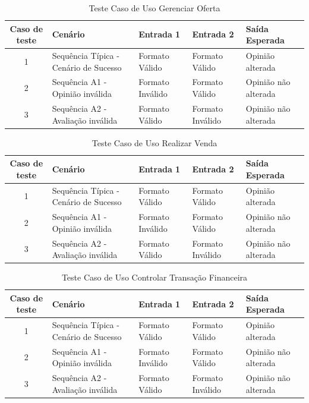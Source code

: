 \documentclass[a4paper,11pt]{article}
\begin{document}
	\begin{center}
	\begin{table}[H]
		\begin{tabularx}{\textwidth}{c|X|X|X|X}
			\textbf{Caso de teste} & \textbf{Cenário} & \textbf{Entrada 1} & \textbf{Entrada 2} & \textbf{Saída Esperada} \\
			\hline
			1 & Sequência Típica - Cenário de Sucesso & Formato Válido & Formato Válido & Opinião alterada\\ \hline
			2 & Sequência A1 - Opinião inválida & Formato Inválido & Formato Válido & Opinião não alterada\\ \hline
			3 & Sequência A2 - Avaliação inválida & Formato Válido & Formato Inválido & Opinião não alterada\\ \hline
			
		\end{tabularx}
		\caption{Teste Caso de Uso Gerenciar Oferta}
	\end{table}
	\end{center}
	
	\begin{center}
	\begin{table}[H]
		\begin{tabularx}{\textwidth}{c|X|X|X|X}
			\textbf{Caso de teste} & \textbf{Cenário} & \textbf{Entrada 1} & \textbf{Entrada 2} & \textbf{Saída Esperada} \\
			\hline
			1 & Sequência Típica - Cenário de Sucesso & Formato Válido & Formato Válido & Opinião alterada\\ \hline
			2 & Sequência A1 - Opinião inválida & Formato Inválido & Formato Válido & Opinião não alterada\\ \hline
			3 & Sequência A2 - Avaliação inválida & Formato Válido & Formato Inválido & Opinião não alterada\\ \hline
			
		\end{tabularx}
		\caption{Teste Caso de Uso Realizar Venda}
	\end{table}
	\end{center}
	
	\begin{center}
	\begin{table}[H]
		\begin{tabularx}{\textwidth}{c|X|X|X|X}
			\textbf{Caso de teste} & \textbf{Cenário} & \textbf{Entrada 1} & \textbf{Entrada 2} & \textbf{Saída Esperada} \\
			\hline
			1 & Sequência Típica - Cenário de Sucesso & Formato Válido & Formato Válido & Opinião alterada\\ \hline
			2 & Sequência A1 - Opinião inválida & Formato Inválido & Formato Válido & Opinião não alterada\\ \hline
			3 & Sequência A2 - Avaliação inválida & Formato Válido & Formato Inválido & Opinião não alterada\\ \hline
			
		\end{tabularx}
		\caption{Teste Caso de Uso Controlar Transação Financeira}
	\end{table}
	\end{center}
	
\end{document}
